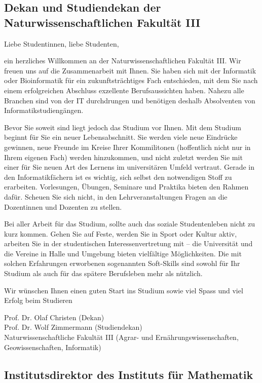 \subsection{Dekan und Studiendekan der Naturwissenschaftlichen Fakultät III}

Liebe Studentinnen, liebe Studenten,

ein herzliches Willkommen an der Naturwissenschaftlichen Fakultät III.
Wir freuen uns auf die Zusammenarbeit mit Ihnen.
Sie haben sich mit der Informatik oder Bioinformatik für ein zukunftsträchtiges Fach entschieden, mit dem Sie nach einem erfolgreichen Abschluss exzellente Berufsaussichten haben.
Nahezu alle Branchen sind von der IT durchdrungen und benötigen deshalb Absolventen von Informatikstudiengängen.

Bevor Sie soweit sind liegt jedoch das Studium vor Ihnen.
Mit dem Studium beginnt für Sie ein neuer Lebensabschnitt.
Sie werden viele neue Eindrücke gewinnen, neue Freunde im Kreise Ihrer Kommilitonen (hoffentlich nicht nur in Ihrem eigenen Fach) werden hinzukommen, und nicht zuletzt werden Sie mit einer für Sie neuen Art des Lernens im universitären Umfeld vertraut.
Gerade in den Informatikfächern ist es wichtig, sich selbst den notwendigen Stoff zu erarbeiten.
Vorlesungen, Übungen, Seminare und Praktika bieten den Rahmen dafür.
Scheuen Sie sich nicht, in den Lehrveranstaltungen Fragen an die Dozentinnen und Dozenten zu stellen. 

Bei aller Arbeit für das Studium, sollte auch das soziale Studentenleben nicht zu kurz kommen. Gehen Sie auf Feste, werden Sie in Sport oder Kultur aktiv, arbeiten Sie in der studentischen Interessenvertretung mit -- die Universität und die Vereine in Halle und Umgebung bieten vielfältige Möglichkeiten.
Die mit solchen Erfahrungen erworbenen sogenannten Soft-Skills sind sowohl für Ihr Studium als auch für das spätere Berufsleben mehr als nützlich.

Wir wünschen Ihnen einen guten Start ins Studium sowie viel Spass und viel Erfolg beim Studieren

Prof. Dr. Olaf Christen (Dekan)\\
Prof. Dr. Wolf Zimmermann (Studiendekan)\\
Naturwissenschaftliche Fakultät III (Agrar- und Ernährungswissenschaften, \newline Geowissenschaften, Informatik)


\subsection{Institutsdirektor des Instituts für Mathematik}

